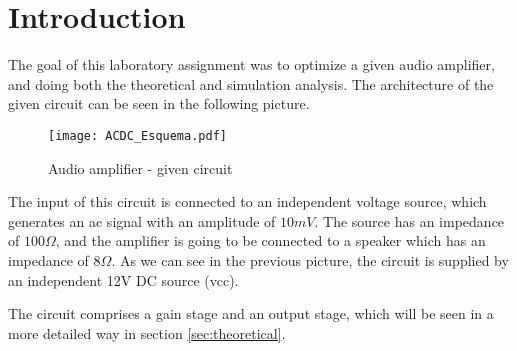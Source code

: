\section{Introduction}
\label{sec:introduction}

\par The goal of this laboratory assignment was to optimize a given audio amplifier, and doing both the theoretical and simulation analysis. The architecture of the given circuit can be seen in the following picture.

\begin{figure}[H] \centering
	\texttt{[image: ACDC\_Esquema.pdf]}
	\caption{Audio amplifier - given circuit}
	\label{fig:1}
\end{figure}

\par The input of this circuit is connected to an independent voltage source, which generates an ac signal with an amplitude of $10mV$. The source has an impedance of $100\Omega$, and the amplifier is going to be connected to a speaker which has an impedance of $8\Omega$. As we can see in the previous picture, the circuit is supplied by an independent 12V DC source (vcc).
\par The circuit comprises a gain stage and an output stage, which will be seen in a more detailed way in section \ref{sec:theoretical}. 

\newpage

